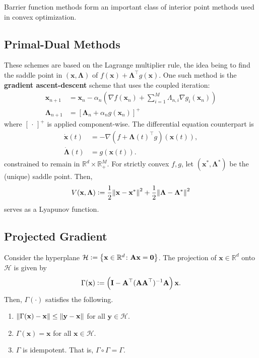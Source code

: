 Barrier function methods form an important class of interior point methods used in convex optimization. 

\subsection*{Primal-Dual Methods}

These schemes are based on the Lagrange multiplier rule, the idea being to find the saddle point in $(\mathbf{x}, \bm{\Lambda})$ of $f(\mathbf{x}) + \bm{\Lambda}^{\top} g(\mathbf{x})$. One such method is the \textbf{gradient ascent-descent} scheme that uses the coupled iteration:
\begin{align*}
    \mathbf{x}_{n+1} &= \mathbf{x}_n - \alpha_n \left( \nabla f(\mathbf{x}_n) + \sum_{i=1}^M \Lambda_{n,i} \nabla g_i(\mathbf{x}_n) \right) \\
    \bm{\Lambda}_{n+1} &= \left[ \bm{\Lambda}_n + \alpha_n g(\mathbf{x}_n) \right]^+
\end{align*}
where $[ \,\cdot\, ]^+$ is applied component-wise. The differential equation counterpart is
\begin{align*}
    \Dot{\mathbf{x}}(t) &= - \nabla \left( f + \bm{\Lambda}(t)^{\top} g \right) (\mathbf{x}(t)), \\
    \Dot{\bm{\Lambda}}(t) &= g(\mathbf{x}(t)). 
\end{align*}
constrained to remain in $\mathbb{R}^d \times \mathbb{R}^M_+$. For strictly convex $f,g$, let $(\mathbf{x}^*, \bm{\Lambda}^*)$ be the (unique) saddle point. Then, 
\[
    V(\mathbf{x}, \bm{\Lambda}) \vcentcolon= \frac{1}{2} \norm{\mathbf{x} - \mathbf{x}^*}^2 + \frac{1}{2} \norm{\bm{\Lambda} - \bm{\Lambda}^*}^2
\]
serves as a Lyapunov function. 

\subsection*{Projected Gradient}

Consider the hyperplane $\mathcal{H} \vcentcolon= \left\{ \mathbf{x} \in \mathbb{R}^d \colon \mathbf{Ax} = \mathbf{0}\right\}$. The projection of $\mathbf{x} \in \mathbb{R}^d$ onto $\mathcal{H}$ is given by
\[
    \Gamma (\mathbf{x}) \vcentcolon= \left( \mathbf{I} - \mathbf{A}^{\top} (\mathbf{AA}^{\top})^{-1} \mathbf{A} \right) \mathbf{x}. 
\]
Then, $\Gamma(\cdot)$ satisfies the following. 
\begin{enumerate}
    \item $\norm{\Gamma(\mathbf{x}) - \mathbf{x}} \leq \norm{\mathbf{y} - \mathbf{x}}$ for all $\mathbf{y} \in \mathcal{H}$.
    \item $\Gamma(\mathbf{x}) = \mathbf{x}$ for all $\mathbf{x} \in \mathcal{H}$.
    \item $\Gamma$ is idempotent. That is, $\Gamma \circ \Gamma = \Gamma$.
\end{enumerate}


